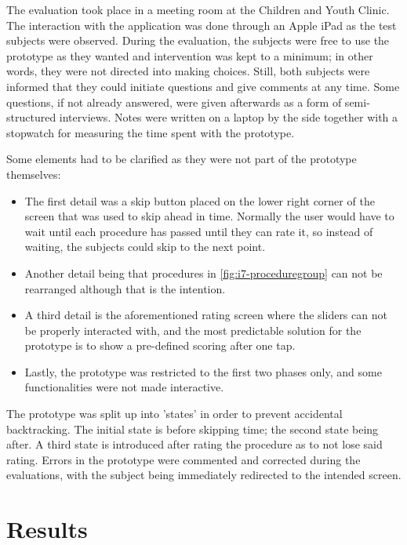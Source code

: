 
The evaluation took place in a meeting room at the Children and Youth Clinic. The interaction with the application was done through an Apple iPad as the test subjects were observed. During the evaluation, the subjects were free to use the prototype as they wanted and intervention was kept to a minimum; in other words, they were not directed into making choices. Still, both subjects were informed that they could initiate questions and give comments at any time. Some questions, if not already answered, were given afterwards as a form of semi-structured interviews. Notes were written on a laptop by the side together with a stopwatch for measuring the time spent with the prototype.

Some elements had to be clarified as they were not part of the prototype themselves: 

\begin{itemize}
    \item The first detail was a skip button placed on the lower right corner of the screen that was used to skip ahead in time. Normally the user would have to wait until each procedure has passed until they can rate it, so instead of waiting, the subjects could skip to the next point.
    \item Another detail being that procedures in \autoref{fig:i7-proceduregroup} can not be rearranged although that is the intention. 
    \item A third detail is the aforementioned rating screen where the sliders can not be properly interacted with, and the most predictable solution for the prototype is to show a pre-defined scoring after one tap. 
    \item Lastly, the prototype was restricted to the first two phases only, and some functionalities were not made interactive.
\end{itemize}

The prototype was split up into 'states' in order to prevent accidental backtracking. The initial state is before skipping time; the second state being after. A third state is introduced after rating the procedure as to not lose said rating. Errors in the prototype were commented and corrected during the evaluations, with the subject being immediately redirected to the intended screen.

\section{Results}

